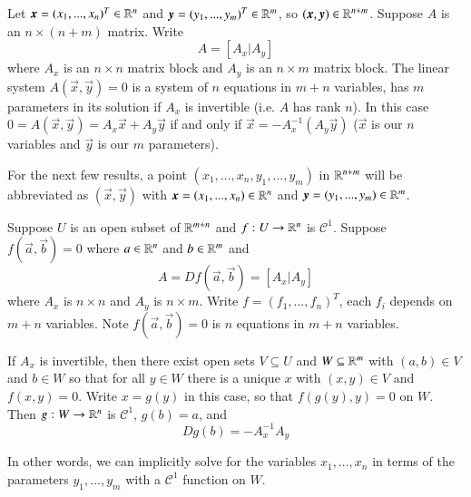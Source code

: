 \begin{example}
    Let $\vec{x} = (x_1,...,x_n)^T \in \R^n$ and $\vec{y} = (y_1,...,y_m)^T \in \R^m$, so $(\vec{x},\vec{y}) \in \R^{n+m}$. Suppose $A$ is an $n\times (n+m)$ matrix. Write $$A = \left[ A_x \Bigg\vert A_y\right]$$ where $A_x$ is an $n\times n$ matrix block and $A_y$ is an $n\times m$ matrix block. The linear system $A(\vec{x},\vec{y}) = 0$ is a system of $n$ equations in $m+n$ variables, has $m$ parameters in its solution if $A_x$ is invertible (i.e. $A$ has rank $n$). In this case $0 = A(\vec{x},\vec{y}) = A_x\vec{x} + A_y\vec{y}$ if and only if $\vec{x} = -A_x^{-1}(A_y\vec{y})$ ($\vec{x}$ is our $n$ variables and $\vec{y}$ is our $m$ parameters).
\end{example}

For the next few results, a point $(x_1,...,x_n,y_1,...,y_m)$ in $\mathbb R^{n+m}$ will be abbreviated as $(\vec{x},\vec{y})$ with $\vec{x} = (x_1,...,x_n) \in \R^n$ and $\vec{y} = (y_1,...,y_m) \in \R^m$.

\begin{theorem}
    Suppose $U$ is an open subset of $\mathbb R^{m+n}$ and $f:U\rightarrow \mathbb R^n$ is $\mathcal{C}^1$. Suppose $f(\vec{a},\vec{b}) = 0$ where $a \in \mathbb R^n$ and $b \in \mathbb R^m$ and $$A = Df(\vec{a},\vec{b}) = \left[A_x\Bigg\vert A_y\right]$$ where $A_x$ is $n\times n$ and $A_y$ is $n\times m$. Write $f = (f_1,...,f_n)^T$, each $f_i$ depends on $m+n$ variables. Note $f(\vec{a},\vec{b}) = 0$ is $n$ equations in $m+n$ variables.

    If $A_x$ is invertible, then there exist open sets $V \subseteq U$ and $W \subseteq \mathbb R^m$ with $(a,b) \in V$ and $b \in W$ so that for all $y \in W$ there is a unique $x$ with $(x,y) \in V$ and $f(x,y) = 0$. Write $x = g(y)$ in this case, so that $f(g(y),y) = 0$ on $W$. Then $g:W\rightarrow \mathbb R^n$ is $\mathcal{C}^1$, $g(b) = a$, and $$Dg(b) = -A_x^{-1}A_y$$ 
\end{theorem}

In other words, we can implicitly solve for the variables $x_1,...,x_n$ in terms of the parameters $y_1,...,y_m$ with a $\mathcal{C}^1$ function on $W$.

